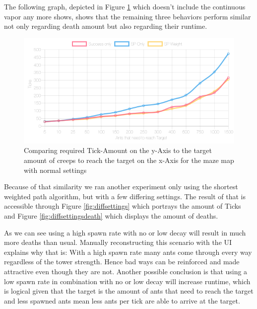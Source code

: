 The following graph, depicted in Figure \ref{fig:threesame} which doesn't include the continuous vapor any more shows, shows that the remaining three behaviors perform similar not only regarding death amount but also regarding their runtime.

\begin{figure}[H]
  \centering
  \includegraphics[width=1\linewidth]{images/normalsquaremaze-ticks-line}
  \caption{Comparing required Tick-Amount on the y-Axis to the target amount of creeps to reach the target on the x-Axis for the maze map with normal settings}
  \label{fig:threesame}
\end{figure}

Because of that similarity we ran another experiment only using the shortest weighted path algorithm, but with a few differing settings. The result of that is accessible through Figure \ref{fig:diffsettings} which portrays the amount of Ticks and Figure \ref{fig:diffsettingsdeath} which displays the amount of deaths.

As we can see using a high spawn rate with no or low decay will result in much more deaths than usual. Manually reconstructing this scenario with the UI explains why that is: With a high spawn rate many ants come through every way regardless of the tower strength. Hence bad ways can be reinforced and made attractive even though they are not.
Another possible conclusion is that using a low spawn rate in combination with no or low decay will increase runtime, which is logical given that the target is the amount of ants that need to reach the target and less spawned ants mean less ants per tick are able to arrive at the target. 

